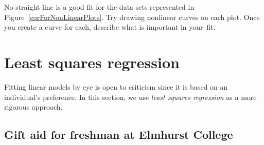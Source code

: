\begin{exercisewrap}
\begin{nexercise}
No straight line is a good fit for the data sets
represented in Figure~\ref{corForNonLinearPlots}.
Try drawing nonlinear curves on each plot.
Once you create a curve for each, describe what is important
in your~fit.\footnotemark{}
\end{nexercise}
\end{exercisewrap}

%




\section{Least squares regression}
\label{fittingALineByLSR}


Fitting linear models by eye is open to criticism since
it is based on an individual's preference.
In this section, we use \emph{least squares regression}
as a more rigorous approach.


\subsection{Gift aid for freshman at Elmhurst College}

